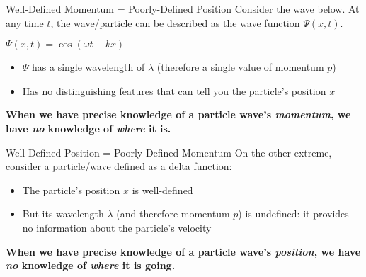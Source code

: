 \documentclass[12pt,compress,aspectratio=169]{beamer}
\begin{document}
\begin{frame}{Well-Defined Momentum = Poorly-Defined Position}
  Consider the wave below. At any time $t$, the wave/particle can be described
  as the wave function $\Psi(x,t)$.
  \begin{center}
    {\footnotesize $\Psi(x,t)=\cos(\omega t-kx)$}\\
  \end{center}
  \begin{itemize}
  \item $\Psi$ has a single wavelength of $\lambda$ (therefore a single
    value of momentum $p$)
  \item Has no distinguishing features that can tell you the particle's
    position $x$
  \end{itemize} 
  \textbf{When we have precise knowledge of a particle wave's \emph{momentum},
    we have \emph{no} knowledge of \emph{where} it is.}
\end{frame}



\begin{frame}{Well-Defined Position = Poorly-Defined Momentum}
  On the other extreme, consider a particle/wave defined as a delta function:
  \begin{center}
  \end{center}
  \begin{itemize}
  \item\vspace{-.4in}The particle's position $x$ is well-defined
  \item But its wavelength $\lambda$ (and therefore momentum $p$) is undefined:
    it provides no information about the particle's velocity
  \end{itemize} 
  \textbf{When we have precise knowledge of a particle wave's \emph{position},
    we have \emph{no} knowledge of \emph{where} it is going.}
\end{frame}
\end{document}
